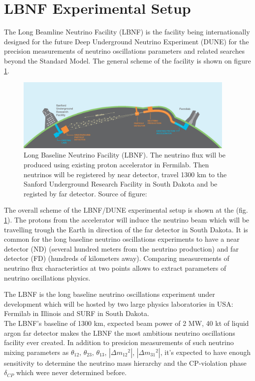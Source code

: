 
\section{LBNF Experimental Setup}

The Long Beamline Neutrino Facility (LBNF) is the facility being internationally designed for the future Deep Underground Neutrino Experiment (DUNE) for the precision measurements of neutrino oscillations parameters and related searches beyond the Standard Model. The general scheme of the facility is shown on figure \ref{fig:LBNF_overallScheme}. 


\begin{figure}
\caption{Long Baseline Neutrino Facility (LBNF). The neutrino flux will be produced using existing proton accelerator in Fermilab. Then neutrinos will be registered by near detector, travel 1300 km to the Sanford Underground Research Facility in South Dakota and be registed by far detector. Source of figure: \cite{ref_LBNFweb} }
\label{fig:LBNF_overallScheme}
\centering
\includegraphics[width=0.95\textwidth, keepaspectratio=true]{figs/LBNF_overallScheme.png} 
\end{figure}

The overall scheme of the LBNF/DUNE experimental setup is shown at the (fig. \ref{fig:LBNF_overallScheme}). The protons from the accelerator  will induce the neutrino beam which will be travelling trough the Earth in direction of the far detector in South Dakota. It is common for the long baseline neutrino oscillations experiments to have a near detector (ND) (several hundred meters from the neutrino production) and far detector (FD) (hundreds of kilometers away). Comparing measurements of neutrino flux characteristics at two points allows to extract parameters of neutrino oscillations physics.








The LBNF is the long baseline neutrino oscillations experiment under development which will be hosted by two large physics laboratories in USA: Fermilab in Illinois and SURF in South Dakota. \\  

The LBNF's baseline of 1300 km, expected beam power of 2 MW, 40 kt of liquid argon far detector makes the LBNF the most ambitious neutrino oscillations facility ever created. In addition to presicion measurements of such neutrino mixing parameters as $\theta_{12}$, $\theta_{23}$, $\theta_{13}$, $|\Delta{m_{12}}^2|$, $|\Delta{m_{31}}^2|$, it's expected to have enough sensitivity to determine the neutrino mass hierarchy and the CP-violation phase $\delta_{CP}$ which were never determined before.\\
